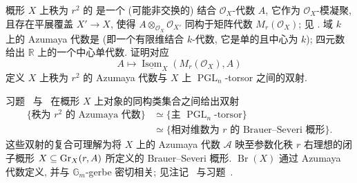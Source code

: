 \begin{exercise}[Azumaya 代数]\label{src:B.1.70}
概形 $X$ 上秩为 $r^2$ 的  是一个 (可能非交换的) 结合 $\mathcal O_X$-代数 $A$, 它作为 $\mathcal O_X$-模凝聚, 且存在平展覆盖 $X'\to X$, 使得 $A\otimes_{\mathcal O_X}\mathcal O_{X'}$ 同构于矩阵代数 $M_r(\mathcal O_X)$; 见 \cite[\S IV.$2$]{Mil80}. 域 $k$ 上的 Azumaya 代数是 (即一个有限维结合 $k$-代数, 它是单的且中心为 $k$); 四元数给出 $\mathbb R$ 上的一个中心单代数. 证明对应
\[
A\longmapsto\underline{\operatorname{Isom}}_X(M_r(\mathcal O_X),A)
\]
定义 $X$ 上秩为 $r^2$ 的 Azumaya 代数与 $X$ 上 $\operatorname{PGL}_n$-torsor 之间的双射.
\end{exercise}
\begin{remark}\label{src:B.1.71}
习题~ 与~ 在概形 $X$ 上对象的同构类集合之间给出双射
\[
\begin{aligned}
\{\text{秩为 }r^2\text{ 的 Azumaya 代数}\}
&\simeq\{\text{主 }\operatorname{PGL}_n\text{-torsor}\}\\
&\simeq\{\text{相对维数为 }r\text{ 的 Brauer--Severi 概形}\}.
\end{aligned}
\]
这些双射的复合可理解为将 $X$ 上的 Azumaya 代数 $\mathcal A$ 映至参数化秩 $r$ 右理想的闭子概形 $X\subseteq\operatorname{Gr}_X(r,A)$ 所定义的 Brauer--Severi 概形.  $\operatorname{Br}(X)$ 通过 Azumaya 代数定义, 并与 $\mathbb G_m$-gerbe 密切相关; 见注记~ 与习题~.
\end{remark}
\par\clearpage
\endgroup
